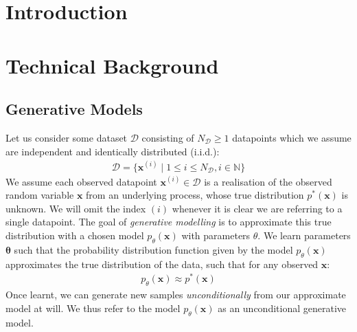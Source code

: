 \documentclass[ oneside,%
                    author={George Herbert},
                    degree={MSci},
                     title={Video Diffusion Models for Climate Simulations},
                  subtitle={}]{dissertation}
\begin{document}
%

\mainmatter


\chapter{Introduction}
\label{chap:introduction}

\chapter{Technical Background}
\label{chap:background}

\section{Generative Models}
\label{sec:background_generative}

Let us consider some dataset $\mathcal{D}$ consisting of $N_{\mathcal{D}}\ge1$ datapoints which we assume are independent and identically distributed (i.i.d.):
\begin{align}
      \mathcal{D}=\{\mathbf{x}^{(i)}\mid 1 \le i \le N_{\mathcal{D}}, i \in \mathbb{N} \}
\end{align}
We assume each observed datapoint $\mathbf{x}^{(i)}\in\mathcal{D}$ is a realisation of the observed random variable $\mathbf{x}$ from an underlying process, whose true distribution $p^*(\mathbf{x})$ is unknown. We will omit the index $(i)$ whenever it is clear we are referring to a single datapoint. The goal of \textit{generative modelling} is to approximate this true distribution with a chosen model $p_\theta(\mathbf{x})$ with parameters $\theta$. We learn parameters $\mathbf{\theta}$ such that the probability distribution function given by the model $p_\theta(\mathbf{x})$ approximates the true distribution of the data, such that for any observed $\mathbf{x}$:
\begin{align}
      p_\theta(\mathbf{x}) \approx p^*(\mathbf{x})
\end{align}
Once learnt, we can generate new samples \textit{unconditionally} from our approximate model at will. We thus refer to the model $p_\theta(\mathbf{x})$ as an unconditional generative model.
\end{document}

